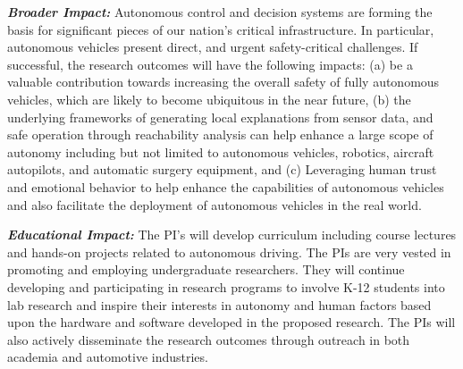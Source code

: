 \noindent\emph{\textbf{Broader Impact:}} 
Autonomous control and decision systems are forming the basis for significant pieces of our nation’s critical infrastructure. In particular, autonomous vehicles present direct, and urgent safety-critical challenges. If successful, the research outcomes will have the following impacts: (a) be a valuable contribution towards increasing the overall safety of fully autonomous vehicles, which are likely to become ubiquitous in the near future, (b) the underlying frameworks of generating local explanations from sensor data, and safe operation through reachability analysis can help enhance a large scope of autonomy including but not limited to autonomous vehicles, robotics, aircraft autopilots, and automatic surgery equipment, and (c) Leveraging human trust and emotional behavior to help enhance the capabilities of autonomous vehicles and also facilitate the deployment of autonomous vehicles in the real world. 

\noindent\emph{\textbf{Educational Impact:}} The PI's will develop curriculum including course lectures and hands-on projects related to autonomous driving. The PIs are very vested in promoting and employing undergraduate researchers. They will continue developing and participating in research programs to involve K-12 students into lab research and inspire their interests in autonomy and human factors based upon the hardware and software developed in the proposed research. The PIs will also actively disseminate the research outcomes through outreach in both academia and automotive industries.















